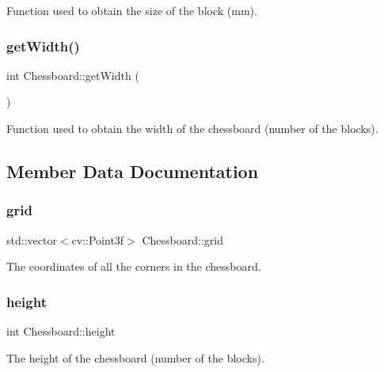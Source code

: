 Function used to obtain the size of the block (mm). 

\mbox{\label{class_chessboard_aeecfc5f0c890fec1db2a45619332459b}} 
\subsubsection{\texorpdfstring{get\+Width()}{getWidth()}}
{\footnotesize\ttfamily int Chessboard\+::get\+Width (\begin{DoxyParamCaption}{ }\end{DoxyParamCaption})}



Function used to obtain the width of the chessboard (number of the blocks). 



\subsection{Member Data Documentation}
\mbox{\label{class_chessboard_aa503005107b822a202c296598a81096b}} 
\subsubsection{\texorpdfstring{grid}{grid}}
{\footnotesize\ttfamily std\+::vector$<$cv\+::\+Point3f$>$ Chessboard\+::grid\hspace{0.3cm}{\ttfamily [private]}}

The coordinates of all the corners in the chessboard. \mbox{\label{class_chessboard_ad7baa62b4f5f47627bae49a53475a56c}} 
\subsubsection{\texorpdfstring{height}{height}}
{\footnotesize\ttfamily int Chessboard\+::height\hspace{0.3cm}{\ttfamily [private]}}

The height of the chessboard (number of the blocks). \mbox{\label{class_chessboard_a898569d2e3c1e297f9915fa437c41082}} 

